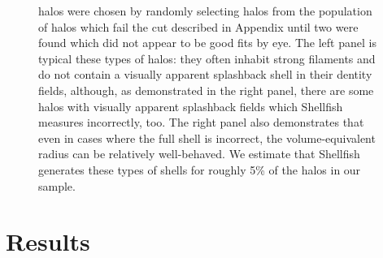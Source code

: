 \documentclass[numberedappendix,apj]{emulateapj}
\begin{document}
\begin{figure}
{        halos were chosen by randomly selecting halos from the population of
        halos which fail the cut described in Appendix \label{sec:visual} until
        two were found which did not appear to be
        good fits by eye. The left panel is typical these types of halos: they
        often inhabit strong filaments and do not contain a visually apparent 
        splashback shell in their dentity fields, although, as demonstrated in
        the right panel, there are some halos with visually apparent splashback
        fields which Shellfish measures incorrectly, too. The right panel also
        demonstrates that even in cases where the full shell is incorrect, the
        volume-equivalent radius can be relatively well-behaved. We estimate
        that Shellfish generates these types of shells for roughly 5\% of the
        halos in our sample.}
        \label{fig:fail_ex}
\end{figure}

\section{Results}
\label{sec:results}
\end{document}
